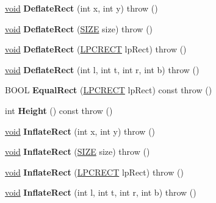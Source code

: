 \begin{DoxyCompactItemize}
\hyperlink{interfacevoid}{void} {\bfseries Deflate\+Rect} (int x, int y)  throw ()
\item 
\mbox{\label{class_c_rect_a7be5e8a981096feb02d3906663481e90}} 
\hyperlink{interfacevoid}{void} {\bfseries Deflate\+Rect} (\hyperlink{structtag_s_i_z_e}{S\+I\+ZE} size)  throw ()
\item 
\mbox{\label{class_c_rect_a201ac17fa5b462599ebbaaad09fc9281}} 
\hyperlink{interfacevoid}{void} {\bfseries Deflate\+Rect} (\hyperlink{structtag_r_e_c_t}{L\+P\+C\+R\+E\+CT} lp\+Rect)  throw ()
\item 
\mbox{\label{class_c_rect_a35a470664ef06430c28411597d505834}} 
\hyperlink{interfacevoid}{void} {\bfseries Deflate\+Rect} (int l, int t, int r, int b)  throw ()
\item 
\mbox{\label{class_c_rect_a6892deec683b36a0de7b536260e257cf}} 
B\+O\+OL {\bfseries Equal\+Rect} (\hyperlink{structtag_r_e_c_t}{L\+P\+C\+R\+E\+CT} lp\+Rect) const  throw ()
\item 
\mbox{\label{class_c_rect_a9f4b3d4bdc6ebeb577c120f52c8e38b9}} 
int {\bfseries Height} () const  throw ()
\item 
\mbox{\label{class_c_rect_aa611c74c47f49673133c91bd1b4b23ed}} 
\hyperlink{interfacevoid}{void} {\bfseries Inflate\+Rect} (int x, int y)  throw ()
\item 
\mbox{\label{class_c_rect_a9f0d48fe835e2431f5e99fde513c5341}} 
\hyperlink{interfacevoid}{void} {\bfseries Inflate\+Rect} (\hyperlink{structtag_s_i_z_e}{S\+I\+ZE} size)  throw ()
\item 
\mbox{\label{class_c_rect_a2c360f39180991ef3ad954c2f23397e2}} 
\hyperlink{interfacevoid}{void} {\bfseries Inflate\+Rect} (\hyperlink{structtag_r_e_c_t}{L\+P\+C\+R\+E\+CT} lp\+Rect)  throw ()
\item 
\mbox{\label{class_c_rect_a5331a36eb8391390ea853c423c45509c}} 
\hyperlink{interfacevoid}{void} {\bfseries Inflate\+Rect} (int l, int t, int r, int b)  throw ()
\item 
\mbox{\label{class_c_rect_ab753477997056eb001ccdbcddd134e4c}} 

\end{DoxyCompactItemize}
